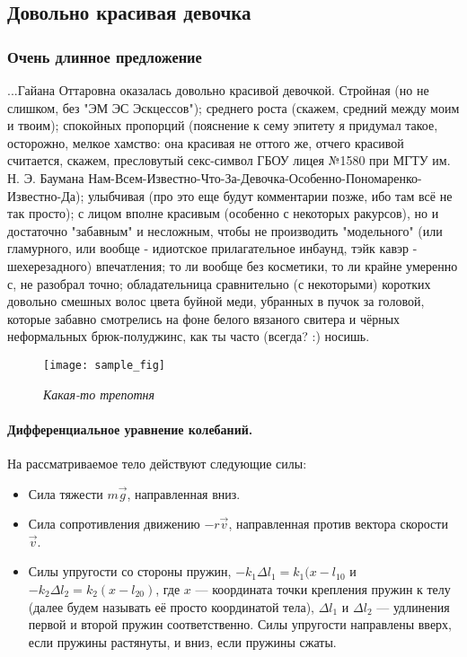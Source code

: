 \documentclass[russian, 12pt]{article}
\begin{document}
\subsection{Довольно красивая девочка}
\subsubsection{Очень длинное предложение}



...Гайана Оттаровна оказалась довольно красивой девочкой. Стройная (но не слишком, без "ЭМ ЭС Эскцессов"); среднего роста (скажем, средний между моим и твоим); спокойных пропорций (пояснение к сему эпитету я придумал такое, осторожно, мелкое хамство: она красивая не оттого же, отчего красивой считается, скажем, пресловутый секс-символ ГБОУ лицея №1580 при МГТУ им. Н. Э. Баумана Нам-Всем-Известно-Что-За-Девочка-Особенно-Пономаренко-Известно-Да); улыбчивая (про это еще будут комментарии позже, ибо там всё не так просто); с лицом вполне красивым (особенно с некоторых ракурсов), но и достаточно "забавным" и несложным, чтобы не производить "модельного" (или гламурного, или вообще - идиотское прилагательное инбаунд, тэйк кавэр - шехерезадного) впечатления; то ли вообще без косметики, то ли крайне умеренно с, не разобрал точно; обладательница сравнительно (с некоторыми) коротких довольно смешных волос цвета буйной меди, убранных в пучок за головой, которые забавно смотрелись на фоне белого вязаного свитера и чёрных неформальных брюк-полуджинс, как ты часто (всегда? :) носишь.


\begin{figure}[h!]
\begin{center}
\texttt{[image: sample\_fig]}
\end{center}
\label{img:tank-wheel-mode}
\caption{\emph{Какая-то трепотня\label{img:tank-wheel-mode}}}
\end{figure}

\newpage

\paragraph{Дифференциальное уравнение колебаний.} На рассматриваемое тело
действуют следующие силы:
\begin{itemize}
  \item Сила тяжести $m\vec g$, направленная вниз.
  \item Сила сопротивления движению $-r \vec v$, направленная против
      вектора скорости $\vec v$.
  \item Силы упругости со стороны пружин, $ - k_1 \Delta l_1 = k_1 (x -
      l_{10}$ и $ - k_2 \Delta l_2 = k_2 (x - l_{20})$, где $x$ ---
      координата точки крепления пружин к телу (далее будем называть её
      просто координатой тела), $\Delta l_1$ и $\Delta l_2$ --- удлинения
      первой и второй пружин соответственно. Силы упругости направлены
      вверх, если пружины растянуты, и вниз, если пружины сжаты.
\end{itemize}
\end{document}
